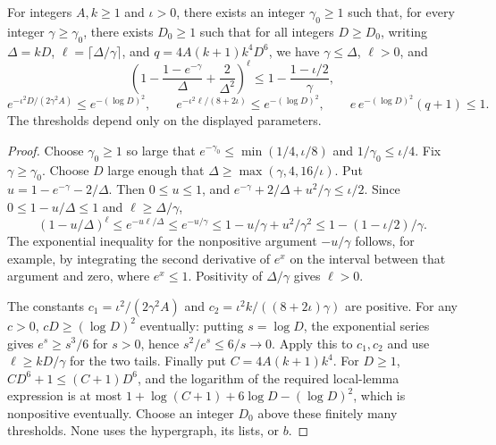 \begin{lemma}
For integers $A,k\ge1$ and $\iota>0$, there exists an integer
$\gamma_0\ge1$ such that, for every integer $\gamma\ge\gamma_0$, there
exists $D_0\ge1$ such that for all integers $D\ge D_0$, writing
$\Delta=kD$, $\ell=\lceil\Delta/\gamma\rceil$, and
$q=4A(k+1)k^4D^6$, we have $\gamma\le\Delta$, $\ell>0$, and
\[
\left(1-\frac{1-e^{-\gamma}}\Delta+\frac2{\Delta^2}\right)^\ell
\le1-\frac{1-\iota/2}\gamma,
\]
\[
e^{-\iota^2D/(2\gamma^2 A)}\le e^{-(\log D)^2},\qquad
e^{-\iota^2\ell/(8+2\iota)}\le e^{-(\log D)^2},\qquad
e\,e^{-(\log D)^2}(q+1)\le1.
\]
The thresholds depend only on the displayed parameters.
\end{lemma}
\begin{proof}
Choose $\gamma_0\ge1$ so large that $e^{-\gamma_0}\le\min(1/4,\iota/8)$
and $1/\gamma_0\le\iota/4$. Fix $\gamma\ge\gamma_0$.
Choose $D$ large enough that $\Delta\ge\max(\gamma,4,16/\iota)$.
Put $u=1-e^{-\gamma}-2/\Delta$. Then $0\le u\le1$, and
$e^{-\gamma}+2/\Delta+u^2/\gamma\le\iota/2$.
Since $0\le1-u/\Delta\le1$ and $\ell\ge\Delta/\gamma$,
\[
(1-u/\Delta)^\ell\le e^{-u\ell/\Delta}
\le e^{-u/\gamma}\le1-u/\gamma+u^2/\gamma^2
\le1-(1-\iota/2)/\gamma.
\]
The exponential inequality for the nonpositive argument $-u/\gamma$
follows, for example, by integrating the second derivative of $e^x$ on
the interval between that argument and zero, where $e^x\le1$.
Positivity of $\Delta/\gamma$ gives $\ell>0$.

The constants $c_1=\iota^2/(2\gamma^2A)$ and
$c_2=\iota^2k/((8+2\iota)\gamma)$ are positive. For any $c>0$,
$cD\ge(\log D)^2$ eventually: putting $s=\log D$, the exponential series
gives $e^s\ge s^3/6$ for $s>0$, hence $s^2/e^s\le6/s\to0$.
Apply this to $c_1,c_2$ and use $\ell\ge kD/\gamma$ for the two tails.
Finally put $C=4A(k+1)k^4$. For $D\ge1$,
$CD^6+1\le(C+1)D^6$, and the logarithm of the required local-lemma
expression is at most $1+\log(C+1)+6\log D-(\log D)^2$, which is
nonpositive eventually. Choose an integer $D_0$ above these finitely many
thresholds. None uses the hypergraph, its lists, or $b$.
\end{proof}
